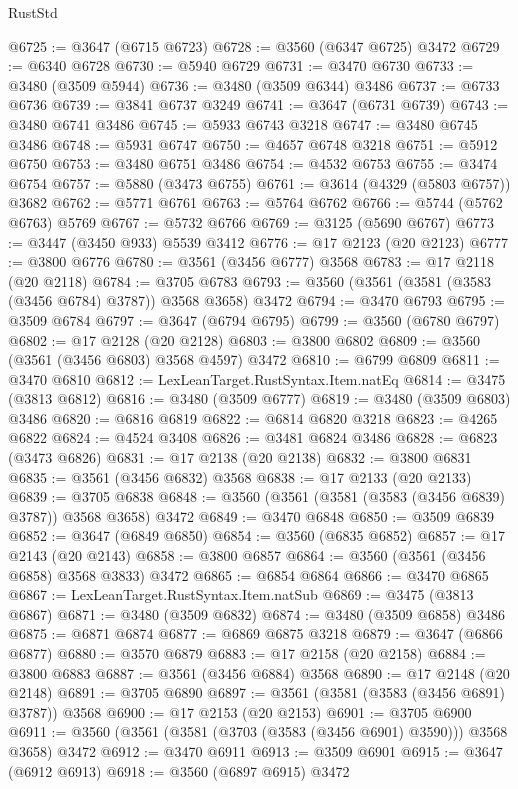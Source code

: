 \begin{lexlean}{RustStd}
\begin{coremodule}
{\begin{coremodule}
{{{{{{{{{{{{{{{{{{{{{{{{{{{{{{{{{{{{{{{{{{{{{@6725 := @3647 (@6715 @6723)
@6728 := @3560 (@6347 @6725) @3472
@6729 := @6340 @6728
@6730 := @5940 @6729
@6731 := @3470 @6730
@6733 := @3480 (@3509 @5944)
@6736 := @3480 (@3509 @6344) @3486
@6737 := @6733 @6736
@6739 := @3841 @6737 @3249
@6741 := @3647 (@6731 @6739)
@6743 := @3480 @6741 @3486
@6745 := @5933 @6743 @3218
@6747 := @3480 @6745 @3486
@6748 := @5931 @6747
@6750 := @4657 @6748 @3218
@6751 := @5912 @6750
@6753 := @3480 @6751 @3486
@6754 := @4532 @6753
@6755 := @3474 @6754
@6757 := @5880 (@3473 @6755)
@6761 := @3614 (@4329 (@5803 @6757)) @3682
@6762 := @5771 @6761
@6763 := @5764 @6762
@6766 := @5744 (@5762 @6763) @5769
@6767 := @5732 @6766
@6769 := @3125 (@5690 @6767)
@6773 := @3447 (@3450 @933) @5539 @3412
@6776 := @17 @2123 (@20 @2123)
@6777 := @3800 @6776
@6780 := @3561 (@3456 @6777) @3568
@6783 := @17 @2118 (@20 @2118)
@6784 := @3705 @6783
@6793 := @3560 (@3561 (@3581 (@3583 (@3456 @6784) @3787)) @3568 @3658) @3472
@6794 := @3470 @6793
@6795 := @3509 @6784
@6797 := @3647 (@6794 @6795)
@6799 := @3560 (@6780 @6797)
@6802 := @17 @2128 (@20 @2128)
@6803 := @3800 @6802
@6809 := @3560 (@3561 (@3456 @6803) @3568 @4597) @3472
@6810 := @6799 @6809
@6811 := @3470 @6810
@6812 := LexLeanTarget.RustSyntax.Item.natEq
@6814 := @3475 (@3813 @6812)
@6816 := @3480 (@3509 @6777)
@6819 := @3480 (@3509 @6803) @3486
@6820 := @6816 @6819
@6822 := @6814 @6820 @3218
@6823 := @4265 @6822
@6824 := @4524 @3408
@6826 := @3481 @6824 @3486
@6828 := @6823 (@3473 @6826)
@6831 := @17 @2138 (@20 @2138)
@6832 := @3800 @6831
@6835 := @3561 (@3456 @6832) @3568
@6838 := @17 @2133 (@20 @2133)
@6839 := @3705 @6838
@6848 := @3560 (@3561 (@3581 (@3583 (@3456 @6839) @3787)) @3568 @3658) @3472
@6849 := @3470 @6848
@6850 := @3509 @6839
@6852 := @3647 (@6849 @6850)
@6854 := @3560 (@6835 @6852)
@6857 := @17 @2143 (@20 @2143)
@6858 := @3800 @6857
@6864 := @3560 (@3561 (@3456 @6858) @3568 @3833) @3472
@6865 := @6854 @6864
@6866 := @3470 @6865
@6867 := LexLeanTarget.RustSyntax.Item.natSub
@6869 := @3475 (@3813 @6867)
@6871 := @3480 (@3509 @6832)
@6874 := @3480 (@3509 @6858) @3486
@6875 := @6871 @6874
@6877 := @6869 @6875 @3218
@6879 := @3647 (@6866 @6877)
@6880 := @3570 @6879
@6883 := @17 @2158 (@20 @2158)
@6884 := @3800 @6883
@6887 := @3561 (@3456 @6884) @3568
@6890 := @17 @2148 (@20 @2148)
@6891 := @3705 @6890
@6897 := @3561 (@3581 (@3583 (@3456 @6891) @3787)) @3568
@6900 := @17 @2153 (@20 @2153)
@6901 := @3705 @6900
@6911 := @3560 (@3561 (@3581 (@3703 (@3583 (@3456 @6901) @3590))) @3568 @3658) @3472
@6912 := @3470 @6911
@6913 := @3509 @6901
@6915 := @3647 (@6912 @6913)
@6918 := @3560 (@6897 @6915) @3472
}}}}}}}}}}}}}}}}}}}}}}}}}}}}}}}}}}}}}}}}}}}}}
\end{coremodule}}
\end{coremodule}
\end{lexlean}
